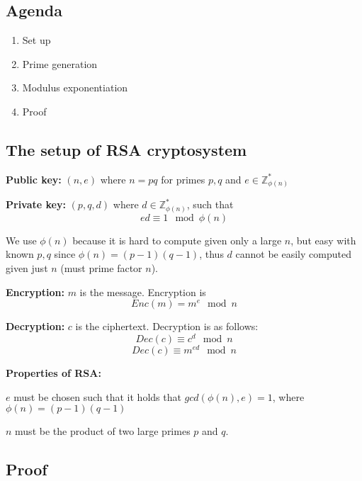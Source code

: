 

\subsection*{Agenda}
\begin{enumerate}
\item Set up
\item Prime generation
\item Modulus exponentiation
\item Proof
\end{enumerate}
\subsection{The setup of RSA cryptosystem}
\textbf{Public key:} $(n, e)$ where $n = pq$ for primes $p, q$ and $e \in \mathbb{Z}_{\phi(n)}^*$

\textbf{Private key:} $(p, q, d)$ where $d \in \mathbb{Z}_{\phi(n)}^*$, such that
\[ ed \equiv 1 \mod \phi(n) \]

We use $\phi(n)$ because it is hard to compute given only a large $n$, but easy with known $p, q$ since $\phi(n) = (p-1)(q-1)$, thus $d$ cannot be easily computed given just $n$ (must prime factor $n$).

\textbf{Encryption:} $m$ is the message. Encryption is
\[ Enc(m) = m^e \mod n \]

\textbf{Decryption:} $c$ is the ciphertext. Decryption is as follows:
\[ Dec(c) \equiv c^d \mod n \]
\[ Dec(c) \equiv m^{ed} \mod n \]

\textbf{Properties of RSA:}

$e$ must be chosen such that it holds that $gcd(\phi(n),e) = 1$, where
$\phi(n) = (p - 1)(q - 1)$

$n$ must be the product of two large primes $p$ and $q$.

\subsection{Proof}
